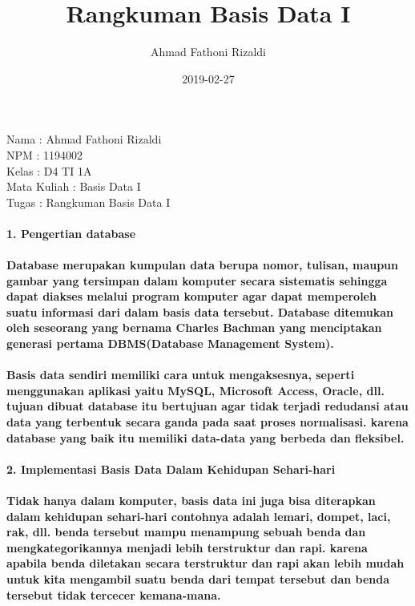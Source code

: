 \documentclass[11pt]{book}
\title{Rangkuman Basis Data I}
\author{Ahmad Fathoni Rizaldi}
\date{2019-02-27}
\begin{document}
\begin{flushleft}
Nama		: Ahmad Fathoni Rizaldi
\\
NPM			: 1194002
\\
Kelas		: D4 TI 1A
\\
Mata Kuliah	: Basis Data I
\\
Tugas		: Rangkuman Basis Data I
\end{flushleft}
\paragraph{1. Pengertian database}
\paragraph{	Database merupakan kumpulan data berupa nomor, tulisan, maupun gambar yang tersimpan dalam komputer secara sistematis sehingga dapat diakses melalui program komputer agar dapat memperoleh suatu informasi dari dalam basis data tersebut. Database ditemukan oleh seseorang yang  bernama Charles Bachman yang menciptakan generasi pertama DBMS(Database Management System).} 
\paragraph{	Basis data sendiri memiliki cara untuk mengaksesnya, seperti menggunakan aplikasi yaitu MySQL, Microsoft Access, Oracle, dll. tujuan dibuat database itu bertujuan agar tidak terjadi redudansi atau data yang terbentuk secara ganda pada saat proses normalisasi. karena database yang baik itu memiliki data-data yang berbeda dan fleksibel.}
\paragraph{2. Implementasi Basis Data Dalam Kehidupan Sehari-hari}
\paragraph{	Tidak hanya dalam komputer, basis data ini juga bisa diterapkan dalam kehidupan sehari-hari contohnya adalah lemari, dompet, laci, rak, dll. benda tersebut mampu menampung sebuah benda dan mengkategorikannya menjadi lebih terstruktur dan rapi. karena apabila benda diletakan secara terstruktur dan rapi akan lebih mudah untuk kita mengambil suatu benda dari tempat tersebut dan benda tersebut tidak tercecer kemana-mana.}
\end{document}
